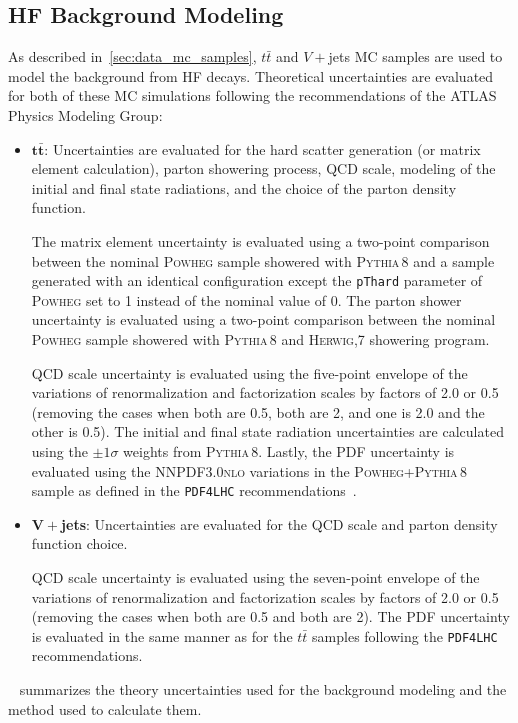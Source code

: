 \subsection*{HF Background Modeling}
As described in~\cref{sec:data_mc_samples}, $t\bar{t}$ and $V+$jets MC samples are used to model the background from HF decays. Theoretical uncertainties are evaluated for both of these MC simulations following the recommendations of the ATLAS Physics Modeling Group:
\begin{itemize}
    \item $\mathbf{t\bar{t}}$: Uncertainties are evaluated for the hard scatter generation (or matrix element calculation), parton showering process, QCD scale, modeling of the initial and final state radiations, and the choice of the parton density function.

    The matrix element uncertainty is evaluated using a two-point comparison between the nominal \textsc{Powheg} sample showered with \textsc{Pythia\,8} and a sample generated with an identical configuration except the \texttt{pThard} parameter of \textsc{Powheg} set to 1 instead of the nominal value of 0. The parton shower uncertainty is evaluated using a two-point comparison between the nominal \textsc{Powheg} sample showered with \textsc{Pythia\,8} and \textsc{Herwig,7} showering program.

    QCD scale uncertainty is evaluated using the five-point envelope of the variations of renormalization and factorization scales by factors of 2.0 or 0.5 (removing the cases when both are 0.5, both are 2, and one is 2.0 and the other is 0.5). The initial and final state radiation uncertainties are calculated using the $\pm 1 \sigma$ weights from \textsc{Pythia\,8}. Lastly, the PDF uncertainty is evaluated using the \textsc{NNPDF3.0nlo} variations in the \textsc{Powheg+Pythia\,8} sample as defined in the \texttt{PDF4LHC} recommendations~\cite{Butterworth_2016}.

    \item $\mathbf{V+}$\textbf{jets}: Uncertainties are evaluated for the QCD scale and parton density function choice.

    QCD scale uncertainty is evaluated using the seven-point envelope of the variations of renormalization and factorization scales by factors of 2.0 or 0.5 (removing the cases when both are 0.5 and both are 2). The PDF uncertainty is evaluated in the same manner as for the $t\bar{t}$ samples following the \texttt{PDF4LHC} recommendations.
\end{itemize}
~ summarizes the theory uncertainties used for the background modeling and the method used to calculate them.

